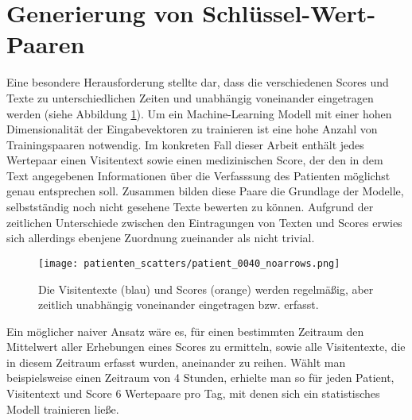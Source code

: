 
\section{Generierung von Schlüssel-Wert-Paaren}\label{sec:pairgen}
Eine besondere Herausforderung stellte dar, dass die verschiedenen Scores und Texte zu unterschiedlichen Zeiten und unabhängig voneinander eingetragen werden (siehe Abbildung \ref{fig:pat40_scatter}).
Um ein Machine-Learning Modell mit einer hohen Dimensionalität der Eingabevektoren zu trainieren ist eine hohe Anzahl von Trainingspaaren notwendig. Im konkreten Fall dieser Arbeit enthält jedes Wertepaar einen Visitentext sowie einen medizinischen Score, der den in dem Text angegebenen Informationen über die Verfasssung des Patienten möglichst genau entsprechen soll. Zusammen bilden diese Paare die Grundlage der Modelle, selbstständig noch nicht gesehene Texte bewerten zu können. Aufgrund der zeitlichen Unterschiede zwischen den Eintragungen von Texten und Scores erwies sich allerdings ebenjene Zuordnung zueinander als nicht trivial. 

\begin{figure}[htb]
    \captionsetup{justification=centering}
    \centering
    \texttt{[image: patienten\_scatters/patient\_0040\_noarrows.png]}
    \caption{Die Visitentexte (blau) und Scores (orange) werden regelmäßig, aber zeitlich unabhängig voneinander eingetragen bzw. erfasst.}
    \label{fig:pat40_scatter}
\end{figure}

Ein möglicher naiver Ansatz wäre es, für einen bestimmten Zeitraum den Mittelwert aller Erhebungen eines Scores zu ermitteln, sowie alle Visitentexte, die in diesem Zeitraum erfasst wurden, aneinander zu reihen. Wählt man beispielsweise einen Zeitraum von 4 Stunden, erhielte man so für jeden Patient, Visitentext und Score 6 Wertepaare pro Tag, mit denen sich ein statistisches Modell trainieren ließe.

